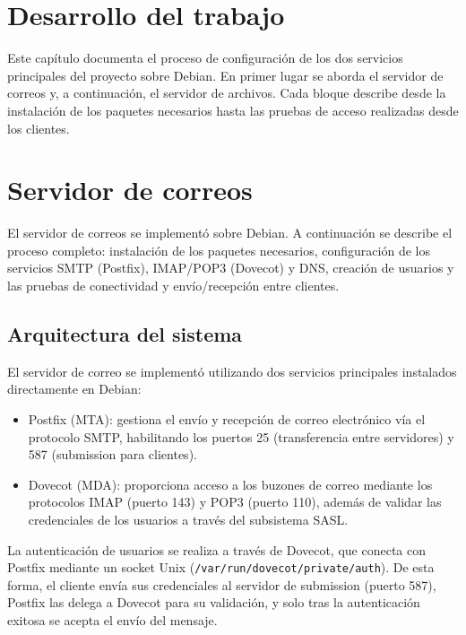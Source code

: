 
\section{Desarrollo del trabajo}

Este capítulo documenta el proceso de configuración de los dos servicios
principales del proyecto sobre Debian. En primer lugar se aborda el servidor
de correos y, a continuación, el servidor de archivos. Cada bloque describe
desde la instalación de los paquetes necesarios hasta las pruebas de acceso
realizadas desde los clientes.

\section{Servidor de correos}

El servidor de correos se implementó sobre Debian. A continuación se describe
el proceso completo: instalación de los paquetes necesarios, configuración de
los servicios SMTP (Postfix), IMAP/POP3 (Dovecot) y DNS, creación de usuarios
y las pruebas de conectividad y envío/recepción entre clientes.

\subsection{Arquitectura del sistema}

El servidor de correo se implementó utilizando dos servicios principales
instalados directamente en Debian:

\begin{itemize}
  \item Postfix (MTA): gestiona el envío y recepción de correo
        electrónico vía el protocolo SMTP, habilitando los puertos 25
        (transferencia entre servidores) y 587 (submission para clientes).
  \item Dovecot (MDA): proporciona acceso a los buzones de correo
        mediante los protocolos IMAP (puerto 143) y POP3 (puerto 110),
        además de validar las credenciales de los usuarios a través del
        subsistema SASL.
\end{itemize}

La autenticación de usuarios se realiza a través de Dovecot, que conecta con
Postfix mediante un socket Unix (\texttt{/var/run/dovecot/private/auth}). De
esta forma, el cliente envía sus credenciales al servidor de submission
(puerto 587), Postfix las delega a Dovecot para su validación, y solo tras
la autenticación exitosa se acepta el envío del mensaje.

